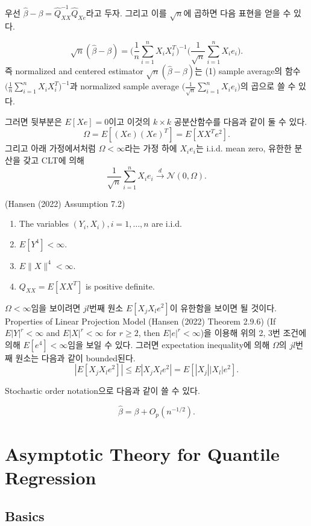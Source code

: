 \documentclass[
  letterpaper,
  DIV=11,
  numbers=noendperiod]{scrreprt}
\providecommand{\tightlist}{%
  \setlength{\itemsep}{0pt}\setlength{\parskip}{0pt}}\usepackage{longtable,booktabs,array}
\theoremstyle{definition}
\theoremstyle{plain}
\theoremstyle{remark}
\begin{document}
우선 \(\hat{\beta}- \beta = \hat{Q}_{XX}^{-1}\hat{Q}_{Xe}\)라고 두자.
그리고 이를 \(\sqrt{n}\)에 곱하면 다음 표현을 얻을 수 있다.

\[
\sqrt{n}(\hat{\beta} - \beta) = \Big( \frac{1}{n}\sum_{i=1}^n X_i X_i^T \Big)^{-1} \Big(\frac{1}{\sqrt{n} }\sum_{i=1}^n X_i e_i \Big).
\]즉 normalized and centered estimator
\(\sqrt{n}(\hat{\beta} - \beta)\)는 (1) sample average의 함수
\(\Big( \frac{1}{n}\sum_{i=1}^n X_i X_i^T \Big)^{-1}\)과 normalized
sample average \(\Big(\frac{1}{\sqrt{n} }\sum_{i=1}^n X_i e_i \Big)\)의
곱으로 쓸 수 있다.

그러면 뒷부분은 \(E[Xe]=0\)이고 이것의 \(k\times k\) 공분산함수를 다음과
같이 둘 수 있다. \[
\Omega = E[(Xe)(Xe)^T] = E[XX^T e^2].
\] 그리고 아래 가정에서처럼 \(\Omega <\infty\)라는 가정 하에
\(X_i e_i\)는 i.i.d. mean zero, 유한한 분산을 갖고 CLT에 의해 \[
\frac{1}{\sqrt{n}} \sum_{i=1}^n X_i e_i \stackrel{d}{\rightarrow}\mathcal{N}(0,\Omega).
\]

(Hansen (2022) Assumption 7.2)

\begin{enumerate}
\def\labelenumi{\arabic{enumi}.}
\tightlist
\item
  The variables \((Y_i, X_i), i=1,\ldots, n\) are i.i.d.
\item
  \(E[Y^4]<\infty\).
\item
  \(E\|X\|^4 <\infty\).
\item
  \(Q_{XX} = E[XX^{T}]\) is positive definite.
\end{enumerate}

\(\Omega <\infty\)임을 보이려면 \(jl\)번째 원소 \(E[X_jX_le^2]\)이
유한함을 보이면 될 것이다. Properties of Linear Projection Model (Hansen
(2022) Theorem 2.9.6) (If \(E|Y|^r <\infty\) and \(E|X|^r <\infty\) for
\(r\geq 2\), then \(E|e|^r <\infty\))을 이용해 위의 2, 3번 조건에 의해
\(E[e^4]<\infty\)임을 보일 수 있다. 그러면 expectation inequality에 의해
\(\Omega\)의 \(jl\)번째 원소는 다음과 같이 bounded된다. \[
|E[X_jX_le^2]|\leq E|X_jX_le^2| = E[|X_j||X_l|e^2].
\]

Stochastic order notation으로 다음과 같이 쓸 수 있다.

\[
\hat{\beta} = \beta + O_p(n^{-1/2}).
\]

\chapter{Asymptotic Theory for Quantile
Regression}\label{asymptotic-theory-for-quantile-regression}

\section{Basics}\label{basics}
\end{document}
